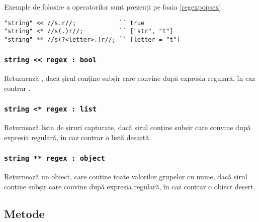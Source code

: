 Exemple de folosire a operatorilor sunt prezenți pe foaia \ref{regexpopsex}.

\begin{sourcecode}
\label{regexpopsex}
\begin{verbatim}
"string" << //s.r//;            `` true
"string" <* //s(.)r//;          `` ["str", "t"]
"string" ** //s(?<letter>.)r//; `` [letter = "t"]
\end{verbatim}
\end{sourcecode}

\subsubsection{\texttt{string << regex : bool}}

Returnează \true{}, dacă șirul conține subșir care convine după expresia regulară, în caz contrar \false{}.

\subsubsection{\texttt{string <* regex : list}}

Returnează lista de șiruri capturate, dacă șirul conține subșir care convine după expresia regulară, în caz contrar o listă deșartă.

\subsubsection{\texttt{string ** regex : object}}

Returnează un obiect, care conține toate valorilor grupelor cu nume, dacă șirul conține subșir care convine după expresia regulară, în caz contrar o obiect deșert.


\subsection{Metode}

